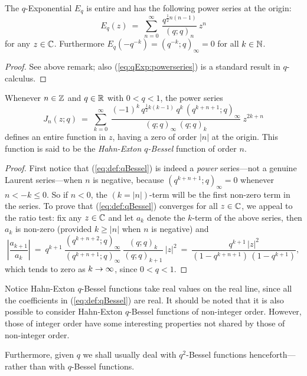 \begin{prop} \label{prop:def:qExp}
The $q$-Exponential $E_q$ is entire and has the following power
series at the origin:
\begin{equation}\label{eq:qExp:powerseries}
  E_q(z)\:=\; \sum_{n=0}^\infty \:\frac{q^{\frac{1}{2}n(n-1)}}{(q;q)_n} \, z^n
\end{equation}
for any $z\in \mathbb{C}$. Furthermore $E_q(-q^{-k})=(q^{-k};q)_\infty=0$
for all $k\in \mathbb{N}$.
\end{prop}
\begin{proof}
See above remark; also (\ref{eq:qExp:powerseries}) is a standard result in $q$-calculus.
\end{proof}

\begin{lemma} \label{lemma:def:qBessel}
Whenever $n \in \mathbb{Z}$ and $q\in\mathbb{R}$ with $0<q<1$, the power series
\begin{equation}\label{eq:def:qBessel}
  J_n(z;q) \:=\; \sum_{k=0}^{\infty} \:
  \frac{(-1)^k\,q^{\frac{1}{2}k(k-1)}\,q^k\,(q^{k+n+1};q)_\infty}{(q;q)_\infty \,(q;q)_k}\:z^{2k+n}
\end{equation}
defines an entire function in $z$, having a zero of order $|n|$ at the origin.
This function is said to be the {\em Hahn-Exton $q$-Bessel\/} function of order $n$.
\end{lemma}
\begin{proof}
First notice that (\ref{eq:def:qBessel}) is indeed a {\em power\/}
series---not a genuine Laurent series---when $n$ is negative,
because $(q^{k+n+1};q)_\infty=0$ whenever $n < -k \leq 0$.
So if $n<0$, the $(k=|n|)$-term will be the first non-zero term
in the series.
To prove that (\ref{eq:def:qBessel}) converges for all $z\in \mathbb{C}$,
we appeal to the ratio test: fix any $z\in \mathbb{C}$ and let
$a_k$ denote the $k$-term of the above series, then $a_k$
is non-zero (provided $k\geq|n|$ when $n$ is negative) and
$$ \left| \frac{a_{k+1}}{a_k} \right| \:=\:
    q^{k+1}\: \frac{(q^{k+n+2};q)_\infty}{(q^{k+n+1};q)_\infty} \:
              \frac{(q;q)_k}{(q;q)_{k+1}}\: |z|^2
    \:=\: \frac{q^{k+1}\, |z|^2}{(1-q^{k+n+1})\, (1- q^{k+1})},  $$
which tends to zero as $k\rightarrow\infty$, since $0<q<1$.
\end{proof}

\begin{remark} \rm
Notice Hahn-Exton $q$-Bessel functions take real values on the real line,
since all the coefficients in (\ref{eq:def:qBessel}) are real.
It should be noted that it is also possible to consider Hahn-Exton
$q$-Bessel functions of non-integer order. However, those
of integer order have some interesting properties not shared
by those of non-integer order.

Furthermore, given $q$ we shall usually deal with $q^2$-Bessel functions
henceforth---rather than with $q$-Bessel functions.
\end{remark}

